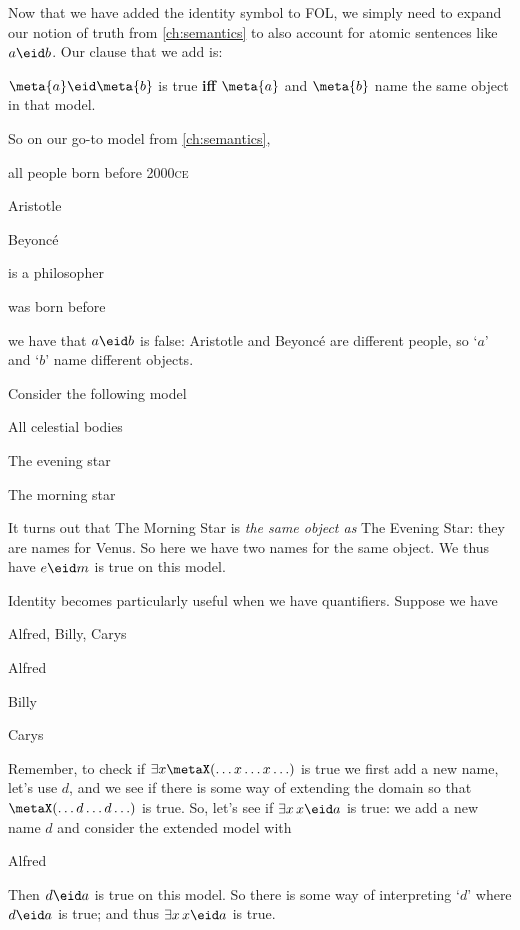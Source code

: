 Now that we have added the identity symbol to FOL, we simply need to expand our notion of truth from \cref{ch:semantics} to also account for atomic sentences like $a\eid b$. Our clause that we add is:
\begin{highlighted}
$\meta{a}\eid\meta{b}$ is true \textbf{iff} $\meta{a}$ and $\meta{b}$ name the same object in that model.
\end{highlighted}
So on our go-to model from \cref{ch:semantics},
\begin{ekey}
		\item[\text{domain}] all people born before 2000\textsc{ce}
		\item[a] Aristotle
		\item[b] Beyonc\'e
		\item[Px]  is a philosopher
		\item[Rxy]  was born before 
	\end{ekey} we have that $a\eid b$ is false: Aristotle and Beyonc\'e are different people, so `$a$' and `$b$' name different objects.

Consider the following model
\begin{ekey}
\item[\text{domain}] All celestial bodies
\item[e] The evening star
\item[m] The morning star
\end{ekey} It turns out that The Morning Star is \emph{the same object as} The Evening Star: they are names for Venus. So here we have two names for the same object. We thus have $e\eid m$ is true on this model.

Identity becomes particularly useful when we have quantifiers. Suppose we have
\begin{ekey}
\item[\text{domain}] Alfred, Billy, Carys
\item[a] Alfred
\item[b] Billy
\item[c] Carys
\end{ekey}
Remember, to check if $\exists x\metaX(\ldots x\ldots x\ldots)$ is true we first add a new name, let's use $d$, and we see if there is some way of extending the domain so that $\metaX(\ldots d\ldots d\ldots)$ is true. So, let's see if $\exists x \,x\eid a$ is true: we add a new name $d$ and consider the extended model with
\begin{ekey}
\item[d] Alfred
\end{ekey}
Then $d\eid a$ is true on this model. So there is some way of interpreting `$d$' where $d\eid a$ is true; and thus $\exists x \, x\eid a$ is true.

